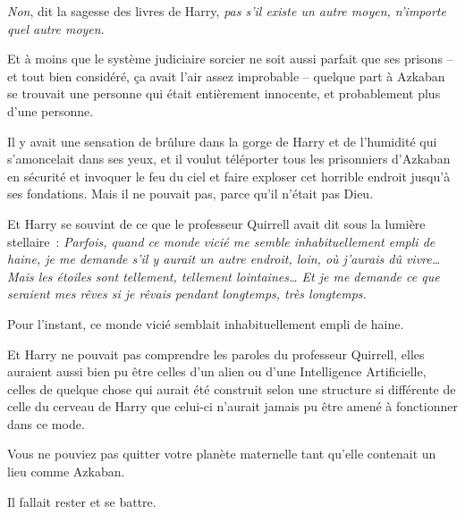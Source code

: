 \emph{Non}, dit la sagesse des livres de Harry, \emph{pas s'il existe un autre moyen, n'importe quel autre moyen}.

Et à moins que le système judiciaire sorcier ne soit aussi parfait que ses prisons -- et tout bien considéré, ça avait l'air assez improbable -- quelque part à Azkaban se trouvait une personne qui était entièrement innocente, et probablement plus d'une personne.

Il y avait une sensation de brûlure dans la gorge de Harry et de l'humidité qui s'amoncelait dans ses yeux, et il voulut téléporter tous les prisonniers d'Azkaban en sécurité et invoquer le feu du ciel et faire exploser cet horrible endroit jusqu'à ses fondations. Mais il ne pouvait pas, parce qu'il n'était pas Dieu.

Et Harry se souvint de ce que le professeur Quirrell avait dit sous la lumière stellaire~: \emph{Parfois, quand ce monde vicié me semble inhabituellement empli de haine, je me demande s'il y aurait un autre endroit, loin, où j'aurais dû vivre… Mais les étoiles sont tellement, tellement lointaines… Et je me demande ce que seraient mes rêves si je rêvais pendant longtemps, très longtemps.}

Pour l'instant, ce monde vicié semblait inhabituellement empli de haine.

Et Harry ne pouvait pas comprendre les paroles du professeur Quirrell, elles auraient aussi bien pu être celles d'un alien ou d'une Intelligence Artificielle, celles de quelque chose qui aurait été construit selon une structure si différente de celle du cerveau de Harry que celui-ci n'aurait jamais pu être amené à fonctionner dans ce mode.

Vous ne pouviez pas quitter votre planète maternelle tant qu'elle contenait un lieu comme Azkaban.

Il fallait rester et se battre.

